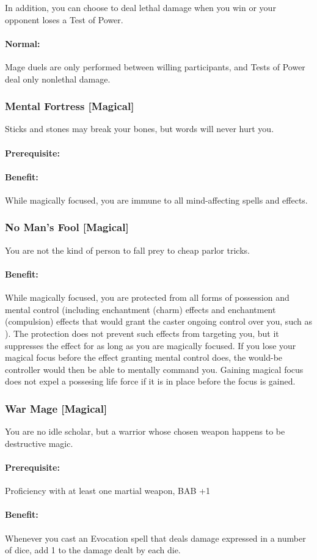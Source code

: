 In addition, you can choose to deal lethal damage when you win or your opponent loses a Test of Power.
\paragraph{Normal:} Mage duels are only performed between willing participants, and Tests of Power deal only nonlethal damage.

\subsubsection[Mental Fortress]{Mental Fortress [Magical]}
\label{Feat:MentalFortress}
Sticks and stones may break your bones, but words will never hurt you.
\paragraph{Prerequisite:} 
\paragraph{Benefit:} While magically focused, you are immune to all mind-affecting spells and effects.

\subsubsection[No Man's Fool]{No Man's Fool [Magical]}
\label{Feat:NoMansFool}
You are not the kind of person to fall prey to cheap parlor tricks.
\paragraph{Benefit:} While magically focused, you are protected from all forms of possession and mental control (including enchantment (charm) effects and enchantment (compulsion) effects that would grant the caster ongoing control over you, such as ). 
The protection does not prevent such effects from targeting you, but it suppresses the effect for as long as you are magically focused. 
If you lose your magical focus before the effect granting mental control does, the would-be controller would then be able to mentally command you. 
Gaining magical focus does not expel a possesing life force if it is in place before the focus is gained. 

\subsubsection[War Mage]{War Mage [Magical]}
\label{Feat:WarMage}
You are no idle scholar, but a warrior whose chosen weapon happens to be destructive magic.

\paragraph{Prerequisite:} Proficiency with at least one martial weapon, BAB +1

\paragraph{Benefit:} Whenever you cast an Evocation spell that deals damage expressed in a number of dice, add 1 to the damage dealt by each die. 